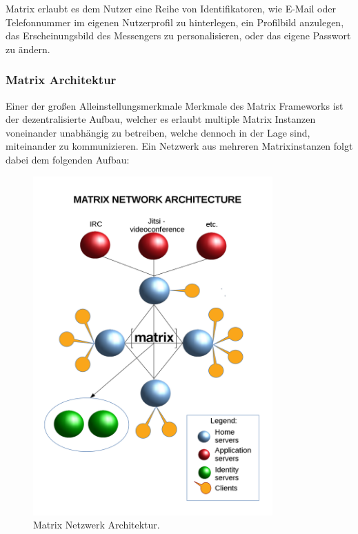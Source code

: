 Matrix erlaubt es dem Nutzer eine Reihe von Identifikatoren, wie E-Mail oder Telefonnummer im eigenen Nutzerprofil zu hinterlegen, ein Profilbild anzulegen, das Erscheinungsbild des Messengers zu personalisieren, oder das eigene Passwort zu ändern.

\subsubsection{Matrix Architektur}\label{chapter:aemn}
Einer der großen Alleinstellungsmerkmale Merkmale des Matrix Frameworks ist der dezentralisierte Aufbau, welcher es erlaubt multiple Matrix Instanzen voneinander unabhängig zu betreiben, welche dennoch in der Lage sind, miteinander zu kommunizieren. Ein Netzwerk aus mehreren Matrixinstanzen folgt dabei dem folgenden Aufbau:

\begin{figure}[htb]
    \centering
    \includegraphics[height=13cm]{graphics/1280px-Diagramme_Matrix_en.png}
    \caption[Matrix Netzwerk Architektur]{Matrix Netzwerk Architektur.\footnotemark}
    \label{abb:DHBWLogo}
\end{figure}

